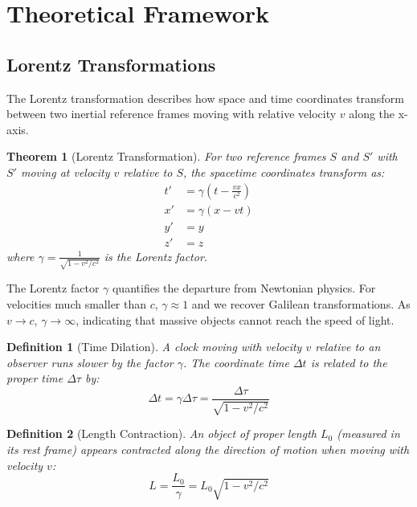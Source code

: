 \documentclass[a4paper, 11pt]{article}
\newtheorem{definition}{Definition}[section]
\newtheorem{theorem}{Theorem}[section]
\begin{document}
\section{Theoretical Framework}

\subsection{Lorentz Transformations}

The Lorentz transformation describes how space and time coordinates transform between two
inertial reference frames moving with relative velocity $v$ along the x-axis.

\begin{theorem}[Lorentz Transformation]
For two reference frames $S$ and $S'$ with $S'$ moving at velocity $v$ relative to $S$,
the spacetime coordinates transform as:
\begin{align}
t' &= \gamma\left(t - \frac{vx}{c^2}\right) \\
x' &= \gamma(x - vt) \\
y' &= y \\
z' &= z
\end{align}
where $\gamma = \frac{1}{\sqrt{1 - v^2/c^2}}$ is the Lorentz factor.
\end{theorem}

The Lorentz factor $\gamma$ quantifies the departure from Newtonian physics. For velocities
much smaller than $c$, $\gamma \approx 1$ and we recover Galilean transformations. As $v \to c$,
$\gamma \to \infty$, indicating that massive objects cannot reach the speed of light.

\begin{definition}[Time Dilation]
A clock moving with velocity $v$ relative to an observer runs slower by the factor $\gamma$.
The coordinate time $\Delta t$ is related to the proper time $\Delta \tau$ by:
\begin{equation}
\Delta t = \gamma \Delta \tau = \frac{\Delta \tau}{\sqrt{1 - v^2/c^2}}
\end{equation}
\end{definition}

\begin{definition}[Length Contraction]
An object of proper length $L_0$ (measured in its rest frame) appears contracted along the
direction of motion when moving with velocity $v$:
\begin{equation}
L = \frac{L_0}{\gamma} = L_0\sqrt{1 - v^2/c^2}
\end{equation}
\end{definition}
\end{document}
